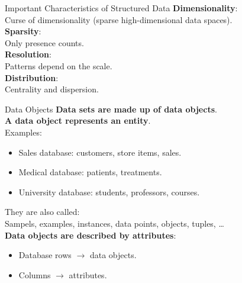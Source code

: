 \begin{frame}{Important Characteristics of Structured Data}
  \textbf{Dimensionality}:\\
  Curse of dimensionality (sparse high-dimensional data spaces).\\[0.2cm]

  \textbf{Sparsity}:\\
  Only presence counts.\\[0.2cm]

  \textbf{Resolution}:\\
  Patterns depend on the scale.\\[0.2cm]

  \textbf{Distribution}:\\
  Centrality and dispersion.
\end{frame}

\begin{frame}{Data Objects}
  \textbf{Data sets are made up of data objects}.\\
  \textbf{A data object represents an entity}.\\[0.2cm]

  Examples:
  \begin{itemize}
  \item Sales database: customers, store items, sales.
  \item Medical database: patients, treatments.
  \item University database: students, professors, courses.
  \end{itemize}

  They are also called:\\
  Sampels, examples, instances, data points, objects, tuples, \ldots\\[0.2cm]

  \textbf{Data objects are described by attributes}:
  \begin{itemize}
  \item Database rows $\rightarrow$ data objects.
  \item Columns $\rightarrow$ attributes.
  \end{itemize}
\end{frame}

